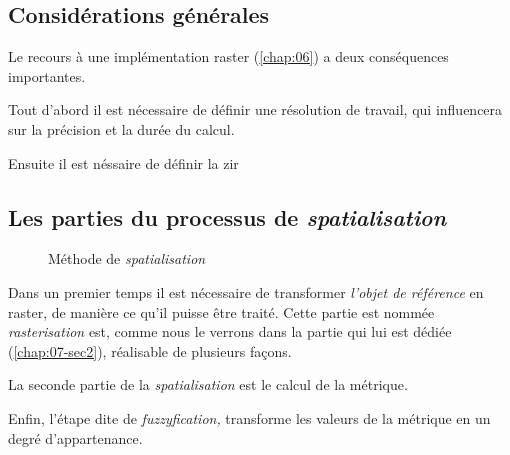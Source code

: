 \subsection{Considérations générales}

Le recours à une implémentation raster (\autoref{chap:06}) a deux conséquences importantes. 

Tout d'abord il est nécessaire de définir une résolution de travail, qui influencera sur la précision et la durée du calcul.

Ensuite il est néssaire de définir la \ac{zir}


\subsection{Les parties du processus de \emph{spatialisation}}



\begin{figure}
  \centering
  
  \caption{Méthode de \emph{spatialisation}}
  \label{fig:methodo_spatialisation}
\end{figure}

%
Dans un premier temps il est nécessaire de
transformer \emph{l'objet de référence} en raster, de manière ce qu'il
puisse être traité. Cette partie est nommée \emph{rasterisation} est,
comme nous le verrons dans la partie qui lui est dédiée
(\autoref{chap:07-sec2}), réalisable de plusieurs façons.

%
La seconde partie de la \emph{spatialisation} est le calcul de la métrique.

%
Enfin, l'étape dite de \emph{fuzzyfication,} transforme les valeurs de la métrique en un degré d'appartenance.


